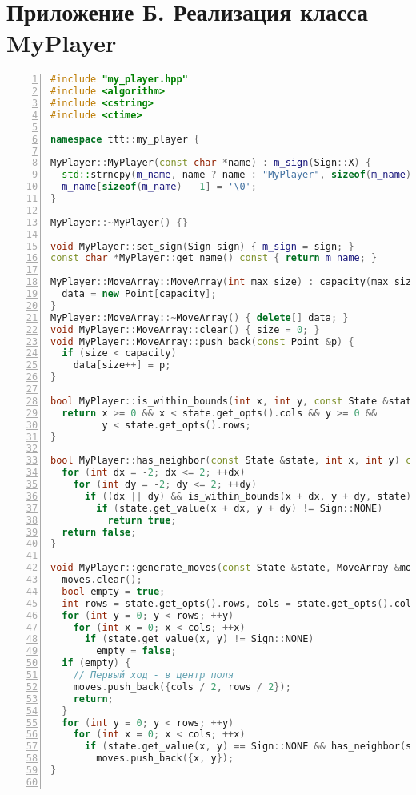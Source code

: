 \section*{Приложение Б. Реализация класса MyPlayer}

\begin{lstlisting}[language=C++,caption={Реализация класса MyPlayer},label={lst:move_array},numbers=left]
#include "my_player.hpp"
#include <algorithm>
#include <cstring>
#include <ctime>

namespace ttt::my_player {

MyPlayer::MyPlayer(const char *name) : m_sign(Sign::X) {
  std::strncpy(m_name, name ? name : "MyPlayer", sizeof(m_name) - 1);
  m_name[sizeof(m_name) - 1] = '\0';
}

MyPlayer::~MyPlayer() {}

void MyPlayer::set_sign(Sign sign) { m_sign = sign; }
const char *MyPlayer::get_name() const { return m_name; }

MyPlayer::MoveArray::MoveArray(int max_size) : capacity(max_size), size(0) {
  data = new Point[capacity];
}
MyPlayer::MoveArray::~MoveArray() { delete[] data; }
void MyPlayer::MoveArray::clear() { size = 0; }
void MyPlayer::MoveArray::push_back(const Point &p) {
  if (size < capacity)
    data[size++] = p;
}

bool MyPlayer::is_within_bounds(int x, int y, const State &state) const {
  return x >= 0 && x < state.get_opts().cols && y >= 0 &&
         y < state.get_opts().rows;
}

bool MyPlayer::has_neighbor(const State &state, int x, int y) const {
  for (int dx = -2; dx <= 2; ++dx)
    for (int dy = -2; dy <= 2; ++dy)
      if ((dx || dy) && is_within_bounds(x + dx, y + dy, state))
        if (state.get_value(x + dx, y + dy) != Sign::NONE)
          return true;
  return false;
}

void MyPlayer::generate_moves(const State &state, MoveArray &moves) const {
  moves.clear();
  bool empty = true;
  int rows = state.get_opts().rows, cols = state.get_opts().cols;
  for (int y = 0; y < rows; ++y)
    for (int x = 0; x < cols; ++x)
      if (state.get_value(x, y) != Sign::NONE)
        empty = false;
  if (empty) {
    // Первый ход - в центр поля
    moves.push_back({cols / 2, rows / 2});
    return;
  }
  for (int y = 0; y < rows; ++y)
    for (int x = 0; x < cols; ++x)
      if (state.get_value(x, y) == Sign::NONE && has_neighbor(state, x, y))
        moves.push_back({x, y});
}


\end{lstlisting}
